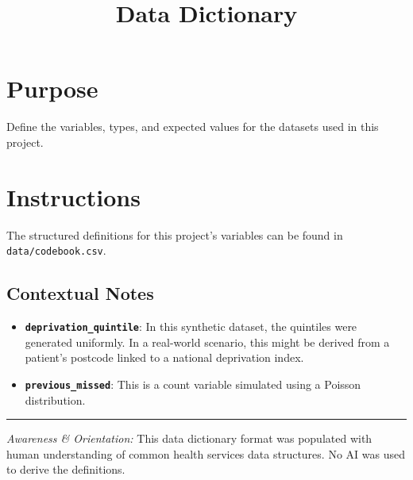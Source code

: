 \documentclass[
]{report}
\title{Data Dictionary}
\author{}
\date{}
\providecommand{\tightlist}{%
  \setlength{\itemsep}{0pt}\setlength{\parskip}{0pt}}
\renewcommand*\contentsname{Table of contents}
\newcommand\contentsname{Table of contents}
\begin{document}
\maketitle

\renewcommand*\contentsname{Table of contents}
{
\hypersetup{linkcolor=}
\setcounter{tocdepth}{2}
\tableofcontents
}

\chapter{Purpose}\label{purpose}

Define the variables, types, and expected values for the datasets used
in this project.

\chapter{Instructions}\label{instructions}

The structured definitions for this project's variables can be found in
\texttt{data/codebook.csv}.

\section{Contextual Notes}\label{contextual-notes}

\begin{itemize}
\tightlist
\item
  \textbf{\texttt{deprivation\_quintile}}: In this synthetic dataset,
  the quintiles were generated uniformly. In a real-world scenario, this
  might be derived from a patient's postcode linked to a national
  deprivation index.
\item
  \textbf{\texttt{previous\_missed}}: This is a count variable simulated
  using a Poisson distribution.
\end{itemize}

\begin{center}\rule{0.5\linewidth}{0.5pt}\end{center}

\begin{tcolorbox}[enhanced jigsaw, coltitle=black, title=\textcolor{quarto-callout-note-color}{\faInfo}\hspace{0.5em}{AI Capability Checkpoint}, opacityback=0, bottomrule=.15mm, arc=.35mm, left=2mm, toptitle=1mm, bottomtitle=1mm, breakable, titlerule=0mm, colframe=quarto-callout-note-color-frame, toprule=.15mm, colback=white, leftrule=.75mm, opacitybacktitle=0.6, rightrule=.15mm, colbacktitle=quarto-callout-note-color!10!white]

\emph{Awareness \& Orientation:} This data dictionary format was
populated with human understanding of common health services data
structures. No AI was used to derive the definitions.

\end{tcolorbox}
\end{document}
